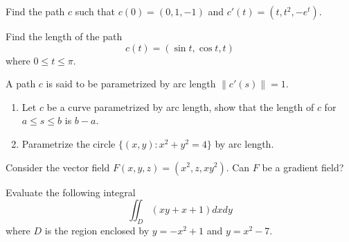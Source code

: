 \documentclass[openany]{book}
\newcommand{\curl}{\text{curl}}
\begin{document}
\begin{prob}
    Find the path $c$ such that $c(0)=(0,1,-1)$ and $c'(t)=(t, t^2, -e^t)$.
\end{prob}

\begin{prob}
    Find the length of the path 
    \begin{equation*}
        c(t)=(\sin t, \cos t, t)
    \end{equation*}
    where $0\leq t\leq \pi$.
\end{prob}


\begin{prob}
    A path $c$ is said to be parametrized by arc length $\|c'(s)\|=1$. 
    \begin{enumerate}
        \item Let $c$ be a curve parametrized by arc length, show that the length of $c$ for $a\leq s\leq b$ is $b-a$.
        \item Parametrize the circle $\{(x,y): x^2+y^2=4\}$ by arc length.
    \end{enumerate}
\end{prob}


\begin{prob}
    Consider the vector field $F(x,y,z)=(x^2, z, xy^2)$. Can $F$ be a gradient field?
\end{prob}



\begin{prob}
    Evaluate the following integral 
    \begin{equation*}
        \iint_D (xy+x+1) dxdy
    \end{equation*}
    where $D$ is the region enclosed by $y=-x^2+1$ and $y=x^2-7$.
\end{prob}
\end{document}
